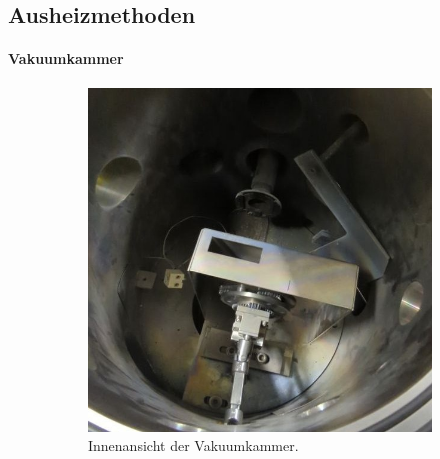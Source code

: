 \subsection{Ausheizmethoden}\label{subsec:ausheiz}

\paragraph{Vakuumkammer}
\begin{figure}
    \centering
    \begin{subfigure}{0.35\textwidth}
        \centering
        \includegraphics[width=\textwidth]{../assets/messmethoden/heiz/chamber}
        \caption{Innenansicht der Vakuumkammer.}
        \label{fig:vakuumkammer}
    \end{subfigure}
    \begin{subfigure}{0.35\textwidth}
        \centering

\end{subfigure}
\end{figure}
